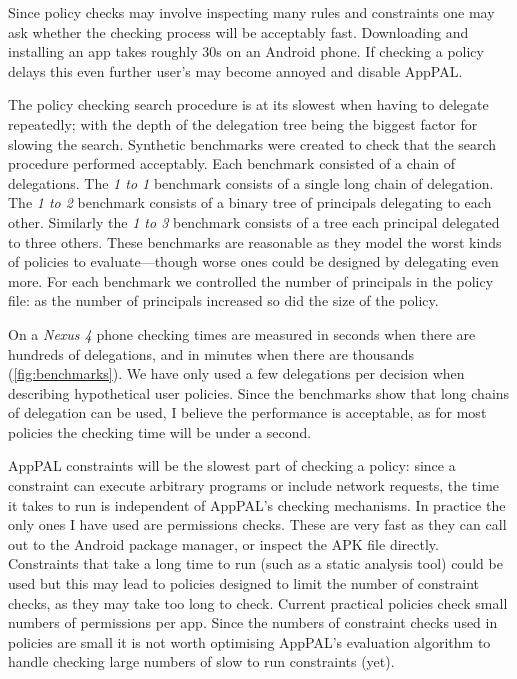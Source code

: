 \documentclass[a4paper]{scrartcl}
\begin{document}
Since policy checks may involve inspecting many rules and constraints one may ask whether the checking process will be acceptably fast.
Downloading and installing an app takes roughly 30s on an Android phone.
If checking a policy delays this even further user's may become annoyed and disable AppPAL.

The policy checking search procedure is at its slowest when having to delegate repeatedly;
  with the depth of the delegation tree being the biggest factor for slowing the search.
Synthetic benchmarks were created to check that the search procedure performed acceptably.
Each benchmark consisted of a chain of delegations.
The \emph{1 to 1} benchmark consists of a single long chain of delegation.
The \emph{1 to 2} benchmark consists of a binary tree of principals delegating to each other.
Similarly the \emph{1 to 3} benchmark consists of a tree each principal delegated to three others.
These benchmarks are reasonable as they model the worst kinds of policies to evaluate---though worse ones could be designed by delegating even more.
For each benchmark we controlled the number of principals in the policy file:
  as the number of principals increased so did the size of the policy.

On a \emph{Nexus 4} phone checking times are measured in seconds when there are hundreds of delegations, and in minutes when there are thousands (\autoref{fig:benchmarks}).
We have only used a few delegations per decision when describing hypothetical user policies.
Since the benchmarks show that long chains of delegation can be used, I believe the performance is acceptable, as for most policies the checking time will be under a second.

AppPAL constraints will be the slowest part of checking a policy:
  since a constraint can execute arbitrary programs or include network requests, the time it takes to run is independent of AppPAL's checking mechanisms.
In practice the only ones I have used are permissions checks.
These are very fast as they can call out to the Android package manager, or inspect the APK file directly.
Constraints that take a long time to run (such as a static analysis tool) could be used but this may lead to policies designed to limit the number of constraint checks, as they may take too long to check.
Current practical policies check small numbers of permissions per app.
Since the numbers of constraint checks used in policies are small it is not worth optimising AppPAL's evaluation algorithm to handle checking large numbers of slow to run constraints (yet).
\end{document}
